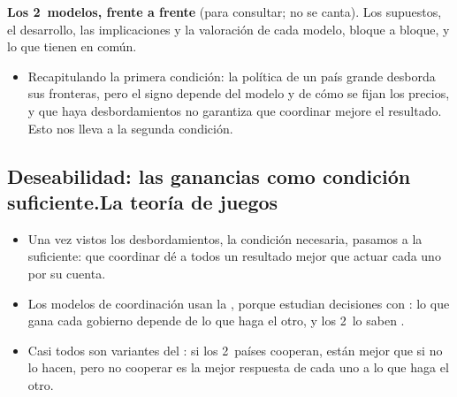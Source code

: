 \documentclass[11pt]{article}
\begin{document}
\begin{anotaciones}
\textbf{Los 2~modelos, frente a frente} (para consultar; no se canta). Los supuestos, el desarrollo, las implicaciones y la valoración de cada modelo, bloque a bloque, y lo que tienen en común.
\begin{infografiacaja}
\caption{- y -: en qué se parecen y en qué difieren}\label{figu:mf-vs-cp}
\end{infografiacaja}
\end{anotaciones}

\begin{itemize}
\item Recapitulando la primera condición: la política de un país grande desborda sus fronteras, pero el signo depende del modelo y de cómo se fijan los precios, y que haya desbordamientos no garantiza que coordinar mejore el resultado. Esto nos lleva a la segunda condición.
\end{itemize}

\subsection{Deseabilidad: las ganancias como condición suficiente.\cortetitulo La teoría de juegos}\label{sec:deseabilidad}

\begin{itemize}
\item Una vez vistos los desbordamientos, la condición necesaria, pasamos a la suficiente: que coordinar dé a todos un resultado mejor que actuar cada uno por su cuenta.
\item Los modelos de coordinación usan la , porque estudian decisiones con : lo que gana cada gobierno depende de lo que haga el otro, y los 2~lo saben .
\item Casi todos son variantes del : si los 2~países cooperan, están mejor que si no lo hacen, pero no cooperar es la mejor respuesta de cada uno a lo que haga el otro.
\end{itemize}

\end{document}
